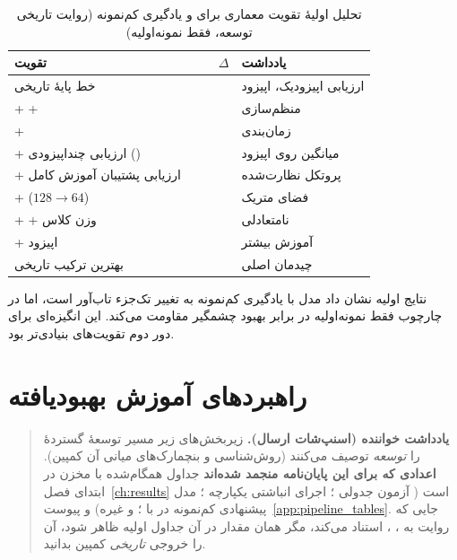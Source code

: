 \begin{table}[htbp]
\centering
\caption{تحلیل اولیۀ تقویت معماری برای  و یادگیری کم‌نمونه (روایت تاریخی توسعه، فقط نمونه‌اولیه)}
\footnotesize
\setlength{\tabcolsep}{2pt}
\renewcommand{\arraystretch}{1.14}
\begin{tabularx}{\linewidth}{@{}R{4.15cm}C{1.35cm}C{1.25cm}C{1.75cm}Y@{}}
\toprule
تقویت &  &  & $\Delta$ & یادداشت \\
\midrule
خط پایۀ تاریخی &&&\cnum{-}& ارزیابی اپیزودیک،  اپیزود \\
+  +  &&&  & منظم‌سازی \\
+  &&&  & زمان‌بندی  \\
+ ارزیابی چنداپیزودی () &&&  & میانگین روی  اپیزود \\
+ ارزیابی پشتیبان آموزش کامل &&&  & پروتکل نظارت‌شده \\
+  ($128{\to}64$) &&&  & فضای متریک \\
+  + وزن کلاس &&&  & نامتعادلی \\
+  اپیزود &&&  & آموزش بیشتر \\
\midrule
بهترین ترکیب تاریخی &&&& چیدمان اصلی \\
\bottomrule
\end{tabularx}
\label{tab:architecture_ablation}
\end{table}

نتایج اولیه نشان داد مدل  با یادگیری کم‌نمونه به تغییر تک‌جزء تاب‌آور است، اما در چارچوب فقط نمونه‌اولیه در برابر بهبود چشمگیر مقاومت می‌کند. این انگیزه‌ای برای دور دوم تقویت‌های بنیادی‌تر بود.

\section{راهبردهای آموزش بهبودیافته}
\label{sec:improved-training}

\begin{quote}
\textbf{یادداشت خواننده (اسنپ‌شات ارسال).} زیربخش‌های زیر مسیر توسعۀ گستردۀ  را \emph{توسعه} توصیف می‌کنند (روش‌شناسی و بنچمارک‌های میانی آن کمپین). \textbf{اعدادی که برای این پایان‌نامه منجمد شده‌اند} جداول همگام‌شده با مخزن در ابتدای فصل~\ref{ch:results} است ( آزمون جدولی  \textbf{}؛ اجرای انباشتی یکپارچه \textbf{} \cnum{[0.699, 0.797]}؛ مدل پیشنهادی کم‌نمونه در  با \textbf{}؛ و غیره) و پیوست~\ref{app:pipeline_tables}. جایی که روایت به ، ،  استناد می‌کند، مگر همان مقدار در آن جداول اولیه ظاهر شود، آن را خروجی \emph{تاریخی} کمپین  بدانید.
\end{quote}

